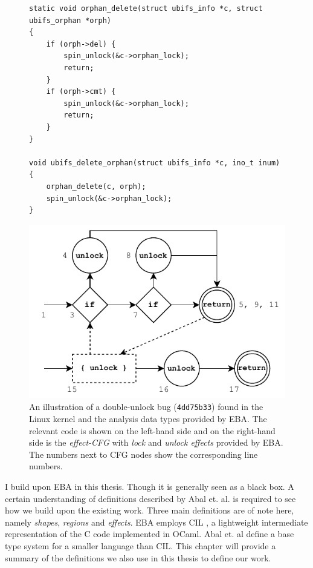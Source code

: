 \begin{figure}[H]
\centering
\begin{minipage}{0.4\textwidth}
    \begin{verbatim}
static void orphan_delete(struct ubifs_info *c, struct ubifs_orphan *orph)
{
	if (orph->del) {
		spin_unlock(&c->orphan_lock);
		return;
	}
	if (orph->cmt) {
		spin_unlock(&c->orphan_lock);
		return;
	}
}

void ubifs_delete_orphan(struct ubifs_info *c, ino_t inum)
{
	orphan_delete(c, orph);
	spin_unlock(&c->orphan_lock);
}
\end{verbatim}
\end{minipage}
\hspace*{0.05\textwidth}
\begin{minipage}{0.45\textwidth}
    \includegraphics[width=\textwidth]{background/figures/annotated-cfg}
\end{minipage}
\caption{An illustration of a double-unlock bug (\texttt{4dd75b33}) found in the Linux kernel and the analysis data types provided by EBA. The relevant code is shown on the left-hand side and on the right-hand side is the \textit{effect-CFG} with \textit{lock} and \textit{unlock effects} provided by EBA. The numbers next to CFG nodes show the corresponding line numbers.}
\label{initial-bug-visualisation}
\end{figure}

\newpar I build upon EBA in this thesis. Though it is generally seen as a black box. A certain understanding of definitions described by Abal et. al. \cite{Abal2017EffectiveBF} is required to see how we build upon the existing work. Three main definitions are of note here, namely \textit{shapes}, \textit{regions} and \textit{effects}. EBA employs CIL \cite{cil}, a lightweight intermediate representation of the C code implemented in OCaml. Abal et. al define a base type system for a smaller language than CIL. This chapter will provide a summary of the definitions we also use in this thesis to define our work. 

